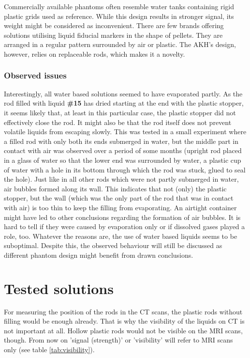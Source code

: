 Commercially available phantoms often resemble water tanks containing rigid plastic grids used as reference.
While this design results in stronger signal, its weight might be considered as inconvenient.
There are few brands offering solutions utilising liquid fiducial markers in the shape of pellets.
They are arranged in a regular pattern surrounded by air or plastic.
The AKH's design, however, relies on replaceable rods, which makes it a novelty.

\subsubsection{Observed issues}

Interestingly, all water based solutions seemed to have evaporated partly.
As the rod filled with liquid \textbf{\#15} has dried starting at the end with the plastic stopper, it seems likely that, at least in this particular case, the plastic stopper did not effectively close the rod.
It might also be that the rod itself does not prevent volatile liquids from escaping slowly.
This was tested in a small experiment where a filled rod with only both its ends submerged in water, but the middle part in contact with air was observed over a period of some months (upright rod placed in a glass of water so that the lower end was surrounded by water, a plastic cup of water with a hole in its bottom through which the rod was stuck, glued to seal the hole).
Just like in all other rods which were not partly submerged in water, air bubbles formed along its wall.
This indicates that not (only) the plastic stopper, but the wall (which was the only part of the rod that was in contact with air) is too thin to keep the filling from evaporating.
An airtight container might have led to other conclusions regarding the formation of air bubbles.
It is hard to tell if they were caused by evaporation only or if dissolved gases played a role, too.
Whatever the reasons are, the use of water based liquids seems to be suboptimal.
Despite this, the observed behaviour will still be discussed as different phantom design might benefit from drawn conclusions.

\section{Tested solutions}

For measuring the position of the rods in the CT scans, the plastic rods without filling would be enough already.
That is why the visibility of the liquids on CT is not important at all.
Hollow plastic rods would not be visible on the MRI scans, though.
From now on 'signal (strength)' or 'visibility' will refer to MRI scans only (see table \ref{tab:visibility}).

